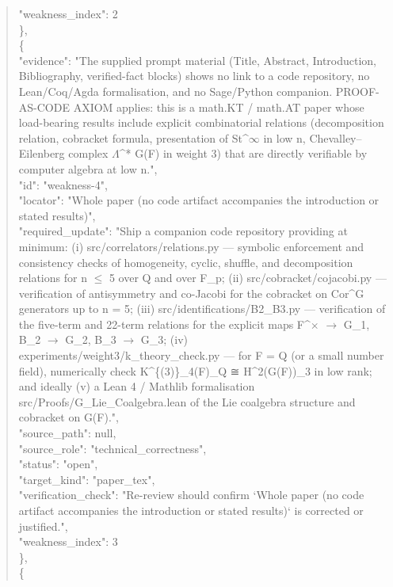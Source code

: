 \documentclass[11pt]{article}
\begin{document}
\begin{quote}
      "weakness\_index": 2\\
    \},\\
    \{\\
      "evidence": "The supplied prompt material (Title, Abstract, Introduction, Bibliography, verified-fact blocks) shows no link to a code repository, no Lean/Coq/Agda formalisation, and no Sage/Python companion. PROOF-AS-CODE AXIOM applies: this is a math.KT / math.AT paper whose load-bearing results include explicit combinatorial relations (decomposition relation, cobracket formula, presentation of St\^{}\ensuremath{\infty} in low n, Chevalley--Eilenberg complex \ensuremath{\Lambda}\^{}* G(F) in weight 3) that are directly verifiable by computer algebra at low n.",\\
      "id": "weakness-4",\\
      "locator": "Whole paper (no code artifact accompanies the introduction or stated results)",\\
      "required\_update": "Ship a companion code repository providing at minimum: (i) src/correlators/relations.py --- symbolic enforcement and consistency checks of homogeneity, cyclic, shuffle, and decomposition relations for n \ensuremath{\le} 5 over Q and over F\_p; (ii) src/cobracket/cojacobi.py --- verification of antisymmetry and co-Jacobi for the cobracket on Cor\^{}G generators up to n = 5; (iii) src/identifications/B2\_B3.py --- verification of the five-term and 22-term relations for the explicit maps F\^{}\ensuremath{\times} \ensuremath{\to} G\_1, B\_2 \ensuremath{\to} G\_2, B\_3 \ensuremath{\to} G\_3; (iv) experiments/weight3/k\_theory\_check.py --- for F = Q (or a small number field), numerically check K\^{}\{(3)\}\_4(F)\_Q ≅ H\^{}2(G(F))\_3 in low rank; and ideally (v) a Lean 4 / Mathlib formalisation src/Proofs/G\_Lie\_Coalgebra.lean of the Lie coalgebra structure and cobracket on G(F).",\\
      "source\_path": null,\\
      "source\_role": "technical\_correctness",\\
      "status": "open",\\
      "target\_kind": "paper\_tex",\\
      "verification\_check": "Re-review should confirm `Whole paper (no code artifact accompanies the introduction or stated results)` is corrected or justified.",\\
      "weakness\_index": 3\\
    \},\\
    \{\\

\end{quote}
\end{document}
